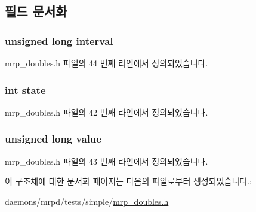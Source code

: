 \subsection{필드 문서화}
\subsubsection[{\texorpdfstring{interval}{interval}}]{\setlength{\rightskip}{0pt plus 5cm}unsigned long interval}\hypertarget{structtimer__double__t_aaaceac04637cd33a7f3fffdd1711e6c5}{}\label{structtimer__double__t_aaaceac04637cd33a7f3fffdd1711e6c5}


mrp\+\_\+doubles.\+h 파일의 44 번째 라인에서 정의되었습니다.

\subsubsection[{\texorpdfstring{state}{state}}]{\setlength{\rightskip}{0pt plus 5cm}int state}\hypertarget{structtimer__double__t_a89f234133d3efe315836311cbf21c64b}{}\label{structtimer__double__t_a89f234133d3efe315836311cbf21c64b}


mrp\+\_\+doubles.\+h 파일의 42 번째 라인에서 정의되었습니다.

\subsubsection[{\texorpdfstring{value}{value}}]{\setlength{\rightskip}{0pt plus 5cm}unsigned long value}\hypertarget{structtimer__double__t_a960ce105570c5c1bdca764f2d8d32a2d}{}\label{structtimer__double__t_a960ce105570c5c1bdca764f2d8d32a2d}


mrp\+\_\+doubles.\+h 파일의 43 번째 라인에서 정의되었습니다.



이 구조체에 대한 문서화 페이지는 다음의 파일로부터 생성되었습니다.\+:\begin{DoxyCompactItemize}
\item 
daemons/mrpd/tests/simple/\hyperlink{mrp__doubles_8h}{mrp\+\_\+doubles.\+h}\end{DoxyCompactItemize}
